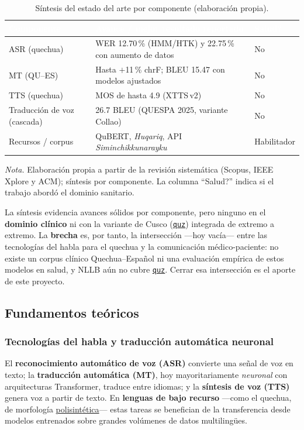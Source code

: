 \documentclass[12pt,a4paper]{article}
\newcommand{\notaAPA}[1]{\par\vspace{2pt}%
  \begin{minipage}{\linewidth}\footnotesize\textit{Nota.} #1\end{minipage}\par}
\newcommand{\hdr}[1]{\textcolor{white}{\textbf{#1}}}            %
\DeclareRobustCommand{\sig}[1]{\hyperlink{sig:#1}{\texttt{#1}}}
\DeclareRobustCommand{\glo}[2]{\hyperlink{glo:#1}{#2}}
\begin{document}
\begin{table}[H]
\centering
\caption{S{\'i}ntesis del estado del arte por componente (elaboraci{\'o}n propia).}
\label{tab:sintesis}
\small
\begin{tabularx}{\linewidth}{@{}l X l@{}}
\toprule
\rowcolor{g5}
\hdr{Componente} & \hdr{Avance / mejor resultado reportado} & \hdr{{\textquestiondown}Salud?} \\
\midrule
ASR (quechua)                  & WER 12.70\,\% (HMM/HTK) y 22.75\,\% con aumento de datos & No \\
MT (QU--ES)                    & Hasta $+$11\,\% chrF; BLEU 15.47 con modelos ajustados   & No \\
TTS (quechua)                  & MOS de hasta 4.9 (XTTS\,v2)                              & No \\
Traducci{\'o}n de voz (cascada) & 26.7 BLEU (QUESPA 2025, variante Collao)                & No \\
Recursos / corpus              & QuBERT, \emph{Huqariq}, API \emph{Siminchikkunarayku}    & Habilitador \\
\bottomrule
\end{tabularx}
\notaAPA{Elaboraci{\'o}n propia a partir de la revisi{\'o}n sistem{\'a}tica (Scopus, IEEE Xplore y ACM); s{\'i}ntesis por componente. La columna ``{\textquestiondown}Salud?'' indica si el trabajo abord{\'o} el dominio sanitario.}
\end{table}

La s{\'i}ntesis evidencia avances s{\'o}lidos por componente, pero ninguno en el \textbf{dominio
cl{\'i}nico} ni con la variante de Cusco (\sig{quz}) integrada de extremo a extremo. La
\textbf{brecha} es, por tanto, la intersecci{\'o}n ---hoy vac{\'i}a--- entre las tecnolog{\'i}as del
habla para el quechua y la comunicaci{\'o}n m{\'e}dico-paciente: no existe un corpus cl{\'i}nico
Quechua--Espa{\~n}ol ni una evaluaci{\'o}n emp{\'i}rica de estos modelos en salud, y NLLB a{\'u}n no
cubre \sig{quz}. Cerrar esa intersecci{\'o}n es el aporte de este proyecto.

\subsection{Fundamentos te{\'o}ricos}

\subsubsection{Tecnolog{\'i}as del habla y traducci{\'o}n autom{\'a}tica neuronal}
El \textbf{reconocimiento autom{\'a}tico de voz (ASR)} convierte una se{\~n}al de voz en texto; la
\textbf{traducci{\'o}n autom{\'a}tica (MT)}, hoy mayoritariamente \emph{neuronal} con arquitecturas
Transformer, traduce entre idiomas; y la \textbf{s{\'i}ntesis de voz (TTS)} genera voz a partir de
texto. En \textbf{lenguas de bajo recurso} ---como el quechua, de morfolog{\'i}a \glo{polisintetica}{polisint{\'e}tica}---
estas tareas se benefician de la transferencia desde modelos entrenados sobre grandes vol{\'u}menes de
datos multiling{\"u}es.
\end{document}
